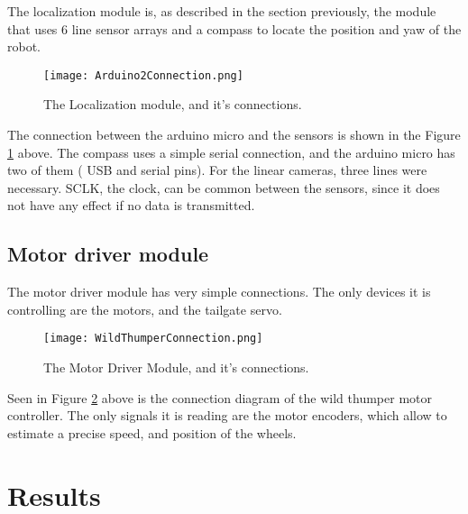 The localization module is, as described in the section previously, the module that uses 6 line sensor arrays and a compass to locate the position and yaw of the robot. 

\begin{figure}[H]
  \centering
  \texttt{[image: Arduino2Connection.png]}
  \caption{The Localization module, and it's connections.}
\label{fig:ard2connection}
\end{figure}

The connection between the arduino micro and the sensors is shown in the Figure \ref{fig:ard2connection} above. The compass uses a simple serial connection, and the arduino micro has two of them ( USB and serial pins). For the linear cameras, three lines were necessary. SCLK, the clock, can be common between the sensors, since it does not have any effect if no data is transmitted. %

\section{Motor driver module}

The motor driver module has very simple connections. The only devices it is controlling are the motors, and the tailgate servo.

\begin{figure}[H]
  \centering
  \texttt{[image: WildThumperConnection.png]}
  \caption{The Motor Driver Module, and it's connections.}
\label{fig:wtconnection}
\end{figure}

Seen in Figure \ref{fig:wtconnection} above is the connection diagram of the wild thumper motor controller. The only signals it is reading are the motor encoders, which allow to estimate a precise speed, and position of the wheels.


\chapter{Results}

